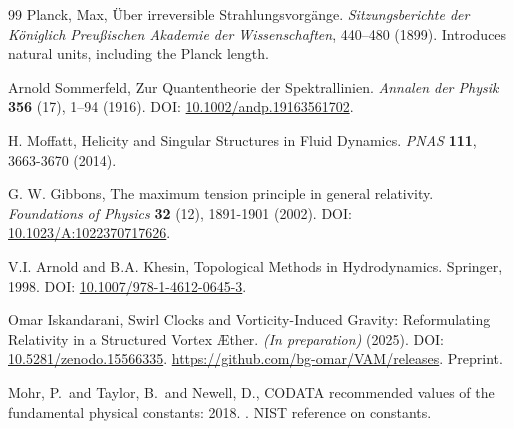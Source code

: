 \documentclass[a4paper,12pt]{article}
\begin{document}
\begin{thebibliography}{99}
Planck, Max,
\newblock Über irreversible Strahlungsvorgänge.
\textit{Sitzungsberichte der Königlich Preußischen Akademie der Wissenschaften}, 440--480 (1899).
\newblock Introduces natural units, including the Planck length.


Arnold Sommerfeld,
\newblock Zur Quantentheorie der Spektrallinien.
\textit{Annalen der Physik} \textbf{356} (17), 1--94 (1916).
\newblock DOI: \href{https://doi.org/10.1002/andp.19163561702}{10.1002/andp.19163561702}.


H. Moffatt,
\newblock Helicity and Singular Structures in Fluid Dynamics.
\textit{PNAS} \textbf{111}, 3663-3670 (2014).


G. W. Gibbons,
\newblock The maximum tension principle in general relativity.
\textit{Foundations of Physics} \textbf{32} (12), 1891-1901 (2002).
\newblock DOI: \href{https://doi.org/10.1023/A:1022370717626}{10.1023/A:1022370717626}.


V.I. Arnold and B.A. Khesin,
\newblock Topological Methods in Hydrodynamics.
\newblock Springer, 1998.
\newblock DOI: \href{https://doi.org/10.1007/978-1-4612-0645-3}{10.1007/978-1-4612-0645-3}.


Omar Iskandarani,
\newblock Swirl Clocks and Vorticity-Induced Gravity: Reformulating Relativity in a Structured Vortex Æther.
\textit{(In preparation)} (2025).
\newblock DOI: \href{https://doi.org/10.5281/zenodo.15566335}{10.5281/zenodo.15566335}.
\newblock \url{https://github.com/bg-omar/VAM/releases}.
\newblock Preprint.


Mohr, P.~and Taylor, B.~and Newell, D.,
\newblock CODATA recommended values of the fundamental physical constants: 2018.
.
\newblock NIST reference on constants.


\end{thebibliography}
\end{document}
